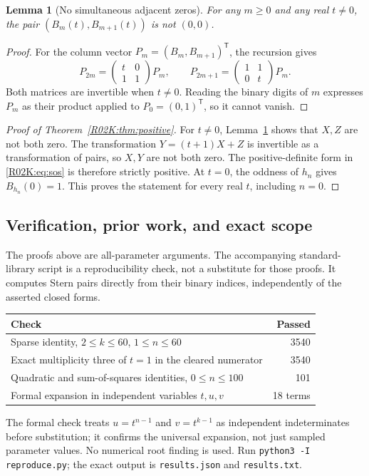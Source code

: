 \documentclass[11pt,a4paper]{article}
\newtheorem{SourceRacKlemma}[SourceRacKtheorem]{Lemma}
\begin{document}
\begin{SourceRacKlemma}[No simultaneous adjacent zeros]\label{R02K:lem:pair}
For any $m\ge0$ and any real $t\ne0$, the pair
$(B_m(t),B_{m+1}(t))$ is not $(0,0)$.
\end{SourceRacKlemma}
\begin{proof}
For the column vector $P_m=(B_m,B_{m+1})^{\mathsf T}$, the recursion gives
\[
P_{2m}=\begin{pmatrix}t&0\\1&1\end{pmatrix}P_m,\qquad
P_{2m+1}=\begin{pmatrix}1&1\\0&t\end{pmatrix}P_m.
\]
Both matrices are invertible when $t\ne0$. Reading the binary digits of
$m$ expresses $P_m$ as their product applied to $P_0=(0,1)^{\mathsf T}$,
so it cannot vanish.
\end{proof}
\begin{proof}[Proof of Theorem~\ref{R02K:thm:positive}]
For $t\ne0$, Lemma~\ref{R02K:lem:pair} shows that $X,Z$ are not both zero.
The transformation $Y=(t+1)X+Z$ is invertible as a transformation of pairs,
so $X,Y$ are not both zero. The positive-definite form in \eqref{R02K:eq:sos}
is therefore strictly positive. At $t=0$, the oddness of $h_n$ gives
$B_{h_n}(0)=1$. This proves the statement for every real $t$, including
$n=0$.
\end{proof}

\subsection{Verification, prior work, and exact scope}
The proofs above are all-parameter arguments. The accompanying
standard-library script is a reproducibility check, not a substitute for
those proofs. It computes Stern pairs directly from their binary indices,
independently of the asserted closed forms.
\begin{center}
\begin{tabular}{@{}p{.68\linewidth}r@{}}
\toprule
Check & Passed\\\midrule
Sparse identity, $2\le k\le60$, $1\le n\le60$ &3540\\
Exact multiplicity three of $t=1$ in the cleared numerator &3540\\
Quadratic and sum-of-squares identities, $0\le n\le100$ &101\\
Formal expansion in independent variables $t,u,v$ &18 terms\\\bottomrule
\end{tabular}
\end{center}
The formal check treats $u=t^{n-1}$ and $v=t^{k-1}$ as independent
indeterminates before substitution; it confirms the universal expansion,
not just sampled parameter values. No numerical root finding is used.
Run \texttt{python3 -I reproduce.py}; the exact output is
\texttt{results.json} and \texttt{results.txt}.
\end{document}
